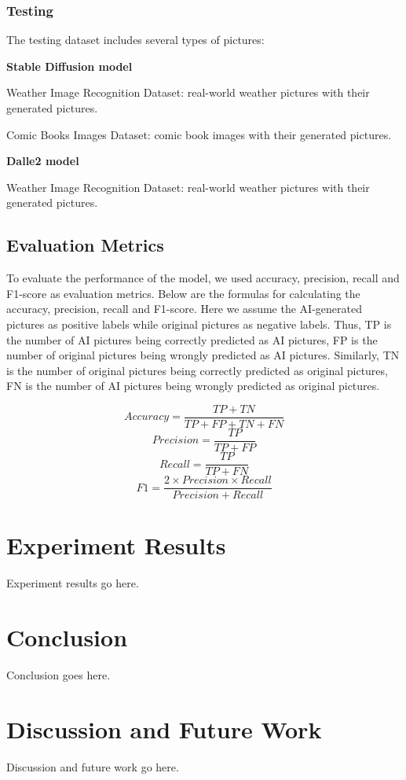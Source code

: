 \documentclass[11pt]{article}
\begin{document}
\subsubsection{Testing}

The testing dataset includes several types of pictures:

\textbf{Stable Diffusion model}

Weather Image Recognition Dataset: real-world weather pictures with their generated pictures.

Comic Books Images Dataset: comic book images with their generated pictures.

\textbf{Dalle2 model}

Weather Image Recognition Dataset: real-world weather pictures with their generated pictures.

\subsection{Evaluation Metrics}

To evaluate the performance of the model, we used accuracy, precision, recall and F1-score as evaluation metrics. Below are the formulas for calculating the accuracy, precision, recall and F1-score. Here we assume the AI-generated pictures as positive labels while original pictures as negative labels. Thus, TP is the number of AI pictures being correctly predicted as AI pictures, FP is the number of original pictures being wrongly predicted as AI pictures. Similarly, TN is the number of original pictures being correctly predicted as original pictures, FN is the number of AI pictures being wrongly predicted as original pictures.

\[
Accuracy = \frac{TP+TN}{TP+FP+TN+FN}
\]
\[
Precision = \frac{TP}{TP+FP}
\]
\[
Recall = \frac{TP}{TP+FN}
\]
\[
F1 = \frac{2 \times Precision \times Recall}{Precision + Recall}
\]


\section{Experiment Results}

Experiment results go here.

\begin{figure}[htbp]
\centering
{}%
\end{figure}

\section{Conclusion}

Conclusion goes here.

\section{Discussion and Future Work}

Discussion and future work go here.



\end{document}

